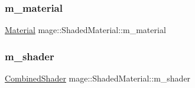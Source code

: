 \subsubsection{\texorpdfstring{m\+\_\+material}{m\_material}}
{\footnotesize\ttfamily \hyperlink{structmage_1_1_material}{Material} mage\+::\+Shaded\+Material\+::m\+\_\+material\hspace{0.3cm}{\ttfamily [private]}}

\hypertarget{structmage_1_1_shaded_material_a712d07ac1995ff592bbb8ab20a294270}{}\label{structmage_1_1_shaded_material_a712d07ac1995ff592bbb8ab20a294270} 
\subsubsection{\texorpdfstring{m\+\_\+shader}{m\_shader}}
{\footnotesize\ttfamily \hyperlink{structmage_1_1_combined_shader}{Combined\+Shader} mage\+::\+Shaded\+Material\+::m\+\_\+shader\hspace{0.3cm}{\ttfamily [private]}}

